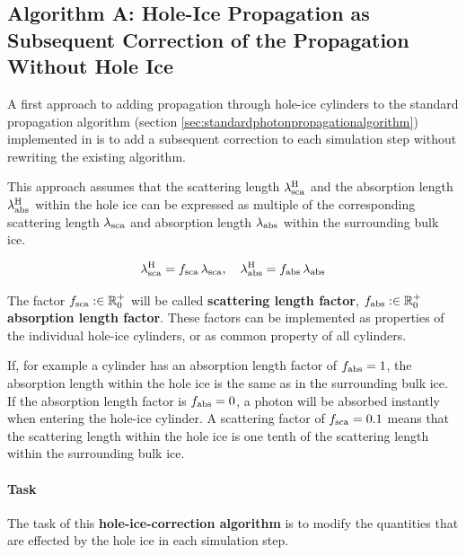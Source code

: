 \subsection{Algorithm A: Hole-Ice Propagation as Subsequent Correction of the Propagation Without Hole Ice}
\label{sec:algorithm_a}

A first approach to adding propagation through hole-ice cylinders to the
standard propagation algorithm (section
\ref{sec:standardphotonpropagationalgorithm}) implemented in \clsim is
to add a subsequent correction to each simulation step without rewriting
the existing algorithm.


This approach assumes that the scattering length \(\lambda^\text{H}_\text{sca}\) and
the absorption length \(\lambda^\text{H}_\text{abs}\) within the hole ice can be
expressed as multiple of the corresponding scattering length
\(\lambda_\text{sca}\) and absorption length \(\lambda_\text{abs}\) within the
surrounding bulk ice.

\[
  \lambda\sca\hi = f\sca \, \lambda\sca, \ \ \ \lambda\abs\hi = f\abs \, \lambda\abs
\]

The factor \(f_\text{sca} :\in \mathbb{R}^+_0\) will be called
\textbf{scattering length factor}, \(f_\text{abs} :\in \mathbb{R}^+_0\)
\textbf{absorption length factor}. These factors can be implemented as
properties of the individual hole-ice cylinders, or as common property
of all cylinders.

If, for example a cylinder has an absorption length factor of
\(f_\text{abs} = 1\), the absorption length within the hole ice is the same as
in the surrounding bulk ice. If the absorption length factor is
\(f_\text{abs} = 0\), a photon will be absorbed instantly when entering the
hole-ice cylinder. A scattering factor of \(f_\text{sca}=0.1\) means that the
scattering length within the hole ice is one tenth of the scattering
length within the surrounding bulk ice.

\paragraph{Task}

The task of this \textbf{hole-ice-correction algorithm} is to modify the
quantities that are effected by the hole ice in each simulation step.

